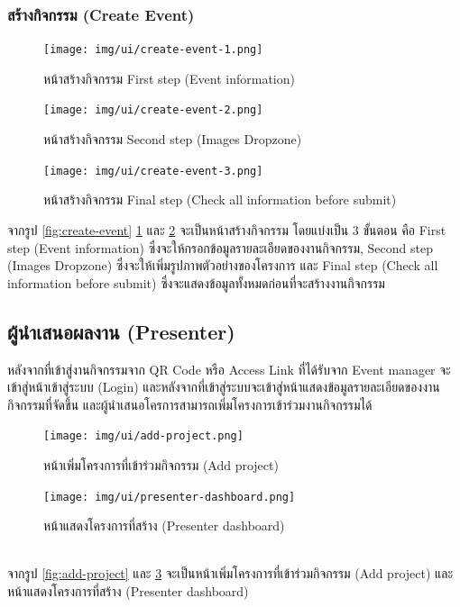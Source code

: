 \clearpage
\subsubsection{สร้างกิจกรรม (Create Event)}
\begin{figure}[h]
    \begin{center}
        \texttt{[image: img/ui/create-event-1.png]}
    \end{center}
    \caption{หน้าสร้างกิจกรรม First step (Event information)}
    \label{fig:create-event}
    \begin{center}
        \texttt{[image: img/ui/create-event-2.png]}
    \end{center}
    \caption{หน้าสร้างกิจกรรม Second step (Images Dropzone)}
    \label{fig:create-event-2}
\end{figure}

\clearpage
\begin{figure}[ht]
    \begin{center}
        \texttt{[image: img/ui/create-event-3.png]}
    \end{center}
    \caption{หน้าสร้างกิจกรรม Final step (Check all information before submit)}
    \label{fig:create-event-3}
\end{figure}
จากรูป \ref{fig:create-event} \ref{fig:create-event-2} และ \ref{fig:create-event-3} จะเป็นหน้าสร้างกิจกรรม โดยแบ่งเป็น 3 ขั้นตอน คือ First step (Event information) ซึ่งจะให้กรอกข้อมูลรายละเอียดของงานกิจกรรม, Second step (Images Dropzone) ซึ่งจะให้เพิ่มรูปภาพตัวอย่างของโครงการ และ Final step (Check all information before submit) ซึ่งจะแสดงข้อมูลทั้งหมดก่อนที่จะสร้างงานกิจกรรม

\clearpage
\subsection{ผู้นำเสนอผลงาน (Presenter)}
หลังจากที่เข้าสู่งานกิจกรรมจาก QR Code หรือ Access Link ที่ได้รับจาก Event manager จะเข้าสู่หน้าเข้าสู่ระบบ (Login) และหลังจากที่เข้าสู่ระบบจะเข้าสู่หน้าแสดงข้อมูลรายละเอียดของงานกิจกรรมที่จัดขึ้น และผู้นำเสนอโครการสามารถเพิ่มโครงการเข้าร่วมงานกิจกรรมได้
\begin{figure}[h]
    \begin{center}
        \texttt{[image: img/ui/add-project.png]}
    \end{center}
    \caption{หน้าเพิ่มโครงการที่เข้าร่วมกิจกรรม (Add project)}
    \label{fig:add-project}

    \begin{center}
        \texttt{[image: img/ui/presenter-dashboard.png]}
    \end{center}
    \caption{หน้าแสดงโครงการที่สร้าง (Presenter dashboard)}
    \label{fig:presenter-dashboard}
\end{figure}
\\
จากรูป \ref{fig:add-project} และ \ref{fig:presenter-dashboard} จะเป็นหน้าเพิ่มโครงการที่เข้าร่วมกิจกรรม (Add project) และ หน้าแสดงโครงการที่สร้าง (Presenter dashboard)

